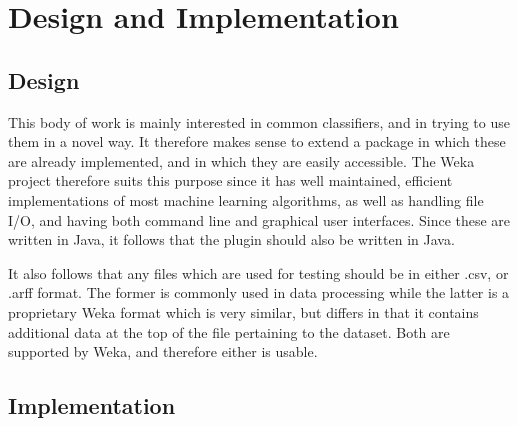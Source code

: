 \newpage
\chapter{Design and Implementation} 
\section{Design}
This body of work is mainly interested in common classifiers, and in trying to use them in a novel way. It therefore makes sense to extend a package in which these are already implemented, and in which they are easily accessible. The Weka project therefore suits this purpose since it has well maintained, efficient implementations of most machine learning algorithms, as well as handling file I/O, and having both command line and graphical user interfaces. Since these are written in Java, it follows that the plugin should also be written in Java.

It also follows that any files which are used for testing should be in either .csv, or .arff format. The former is commonly used in data processing while the latter is a proprietary Weka format which is very similar, but differs in that it contains additional data at the top of the file pertaining to the dataset. Both are supported by Weka, and therefore either is usable.

\section{Implementation}
